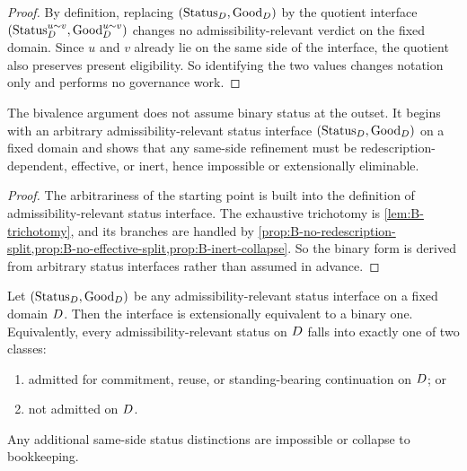 \begin{proof}
By definition, replacing $(\mathrm{Status}_D,\mathrm{Good}_D)$ by the quotient interface $(\mathrm{Status}^{u\sim v}_D,\mathrm{Good}^{u\sim v}_D)$ changes no admissibility-relevant verdict on the fixed domain. Since $u$ and $v$ already lie on the same side of the interface, the quotient also preserves present eligibility. So identifying the two values changes notation only and performs no governance work.
\end{proof}

\begin{proposition}
\label{prop:B-binary-derived}
The bivalence argument does not assume binary status at the outset. It begins with an arbitrary admissibility-relevant status interface $(\mathrm{Status}_D,\mathrm{Good}_D)$ on a fixed domain and shows that any same-side refinement must be redescription-dependent, effective, or inert, hence impossible or extensionally eliminable.
\end{proposition}

\begin{proof}
The arbitrariness of the starting point is built into the definition of admissibility-relevant status interface. The exhaustive trichotomy is \cref{lem:B-trichotomy}, and its branches are handled by \cref{prop:B-no-redescription-split,prop:B-no-effective-split,prop:B-inert-collapse}. So the binary form is derived from arbitrary status interfaces rather than assumed in advance.
\end{proof}

\begin{theorem}
\label{thm:B-bivalence}
Let $(\mathrm{Status}_D,\mathrm{Good}_D)$ be any admissibility-relevant status interface on a fixed domain $D$. Then the interface is extensionally equivalent to a binary one. Equivalently, every admissibility-relevant status on $D$ falls into exactly one of two classes:
\begin{enumerate}[label=(\roman*), leftmargin=2.5em]
    \item admitted for commitment, reuse, or standing-bearing continuation on $D$; or
    \item not admitted on $D$.
\end{enumerate}
Any additional same-side status distinctions are impossible or collapse to bookkeeping.
\end{theorem}

